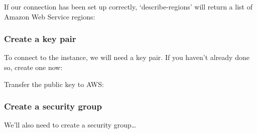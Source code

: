 If our connection has been set up correctly, `describe-regions' will
return a list of Amazon Web Service regions:

\begin{Shaded}
\begin{Highlighting}[]
\NormalTok{$ } 
\end{Highlighting}
\end{Shaded}

\subsubsection{Create a key pair}\label{create-a-key-pair-1}

To connect to the instance, we will need a key pair. If you haven't
already done so, create one now:

\begin{Shaded}
\begin{Highlighting}[]
\NormalTok{$ } 
\end{Highlighting}
\end{Shaded}

Transfer the public key to AWS:

\begin{Shaded}
\begin{Highlighting}[]
\NormalTok{$ } \KeywordTok{<}\KeywordTok{>} \NormalTok{\textbackslash{}}
   \KeywordTok{<}\KeywordTok{>}
\end{Highlighting}
\end{Shaded}

\subsubsection{Create a security group}\label{create-a-security-group}

We'll also need to create a security group\ldots{}

\begin{Shaded}
\begin{Highlighting}[]
\NormalTok{$ } 
    \NormalTok{\textbackslash{}}
   
\end{Highlighting}
\end{Shaded}

